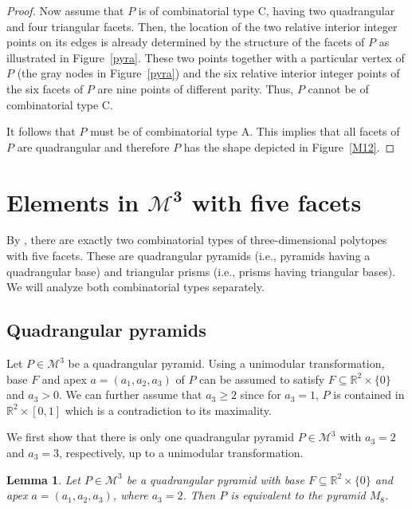 \documentclass[a4paper]{article}
\theoremstyle{plain}
\newtheorem{lemma}[nn]{Lemma}
\begin{document}
\begin{proof}
Now assume that $P$ is of combinatorial type C, having two
quadrangular and four triangular facets.
Then, the location of the two relative interior integer
points on its edges is already determined by the structure
of the facets of $P$ as illustrated in Figure~\ref{pyra}.
These two points together with a particular vertex of $P$
(the gray nodes in Figure~\ref{pyra}) and the six relative
interior integer points of the six facets of $P$ are nine
points of different parity.
Thus, $P$ cannot be of combinatorial type C.

It follows that $P$ must be of combinatorial type A.
This implies that all facets of $P$ are quadrangular and
therefore $P$ has the shape depicted in Figure~\ref{M12}.
\end{proof}

\section{Elements in $\boldsymbol{\mathcal{M}^3}$ with five facets} \label{slicing}

By \cite[Section 6{.}1]{Gruenbaum03}, there are exactly two
combinatorial types of three-dimensional polytopes with five
facets. These are  quadrangular pyramids (i.e., pyramids having a
quadrangular base) and 
triangular prisms (i.e., prisms having triangular
bases). We will analyze both combinatorial types separately. 

\subsection{Quadrangular pyramids} \label{quad-pyramids}

Let $P \in {\mathcal{M}^3}$ be a quadrangular pyramid.
Using a unimodular transformation, base $F$ and apex
$a = (a_1, a_2, a_3)$ of $P$ can be assumed to satisfy $F
\subseteq {\mathbb{R}}^2 \times \{0\}$ and $a_3 > 0$.
We can further assume that $a_3 \geq 2$ since for $a_3 = 1$,
$P$ is contained in ${\mathbb{R}}^2 \times [0,1]$ which is a contradiction to its maximality. 

We first show that there is only one quadrangular pyramid
$P \in {\mathcal{M}^3}$ with $a_3 = 2$ and $a_3 = 3$, respectively, up to
a unimodular transformation.

\begin{lemma}
Let $P \in {\mathcal{M}^3}$ be a quadrangular pyramid with base
$F \subseteq {\mathbb{R}}^2 \times \{0\}$ and apex $a = (a_1, a_2,
a_3)$, where $a_3 = 2$.
Then $P$ is equivalent to the pyramid $M_8$.
\end{lemma}
\end{document}
